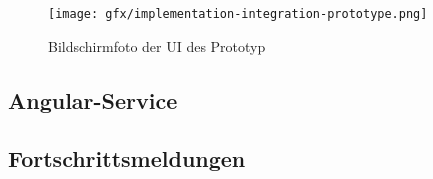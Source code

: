 \begin{figure}
  \centering
  \texttt{[image: gfx/implementation-integration-prototype.png]}
  \caption{Bildschirmfoto der UI des Prototyp}
  \label{fig:implementation:integration:prototype}
\end{figure}

\subsection{Angular-Service}
\label{sec:implementation:integration:ng-service}


\subsection{Fortschrittsmeldungen}
\label{sec:implementation:integration:progress}


